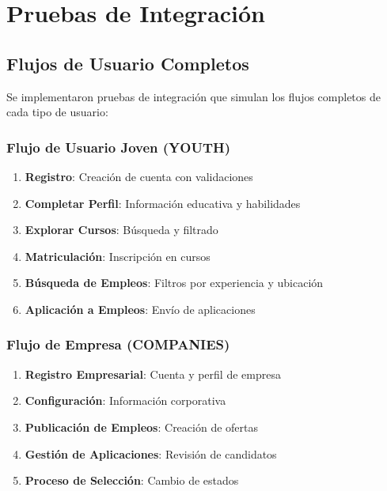 \documentclass[12pt,a4paper]{article}
\begin{document}
\section{Pruebas de Integración}

\subsection{Flujos de Usuario Completos}

Se implementaron pruebas de integración que simulan los flujos completos de cada tipo de usuario:

\subsubsection{Flujo de Usuario Joven (YOUTH)}

\begin{enumerate}
    \item \textbf{Registro}: Creación de cuenta con validaciones
    \item \textbf{Completar Perfil}: Información educativa y habilidades
    \item \textbf{Explorar Cursos}: Búsqueda y filtrado
    \item \textbf{Matriculación}: Inscripción en cursos
    \item \textbf{Búsqueda de Empleos}: Filtros por experiencia y ubicación
    \item \textbf{Aplicación a Empleos}: Envío de aplicaciones
\end{enumerate}

\subsubsection{Flujo de Empresa (COMPANIES)}

\begin{enumerate}
    \item \textbf{Registro Empresarial}: Cuenta y perfil de empresa
    \item \textbf{Configuración}: Información corporativa
    \item \textbf{Publicación de Empleos}: Creación de ofertas
    \item \textbf{Gestión de Aplicaciones}: Revisión de candidatos
    \item \textbf{Proceso de Selección}: Cambio de estados
\end{enumerate}
\end{document}
